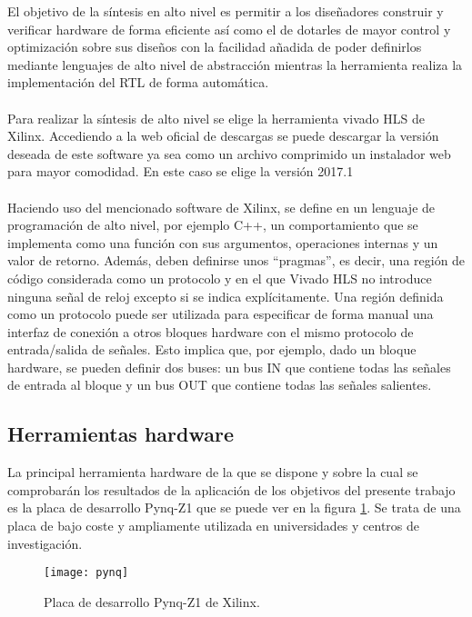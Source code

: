 El objetivo de la síntesis en alto nivel es permitir a los diseñadores construir y verificar hardware de forma eficiente así como el de dotarles de mayor control y optimización sobre sus diseños con la facilidad añadida de poder definirlos mediante lenguajes de alto nivel de abstracción mientras la herramienta realiza la implementación del RTL de forma automática.
\\
\\
Para realizar la síntesis de alto nivel se elige la herramienta vivado HLS de Xilinx. Accediendo a la web oficial de descargas\cite{vivado_descarga} se puede descargar la versión deseada de este software ya sea como un archivo comprimido un instalador web para mayor comodidad. En este caso se elige la versión 2017.1
\\
\\
Haciendo uso del mencionado software de Xilinx, se define en un lenguaje de programación de alto nivel, por ejemplo C++, un comportamiento que se implementa como una función con sus argumentos, operaciones internas y un valor de retorno. Además, deben definirse unos ``pragmas'', es decir, una región de código considerada como un protocolo y en el que Vivado HLS no introduce ninguna señal de reloj excepto si se indica explícitamente. Una región definida como un protocolo puede ser utilizada para especificar de forma manual una interfaz de conexión a otros bloques hardware con el mismo protocolo de entrada/salida de señales. Esto implica que, por ejemplo, dado un bloque hardware, se pueden definir dos buses: un bus IN que contiene todas las señales de entrada al bloque y un bus OUT que contiene todas las señales salientes.



\subsection{Herramientas hardware} \label{herraminetas_hardware}
La principal herramienta hardware de la que se dispone y sobre la cual se comprobarán los resultados de la aplicación de los objetivos del presente trabajo es la placa de desarrollo Pynq-Z1\cite{pynq} que se puede ver en la figura \ref{fig:pynq}. Se trata de una placa de bajo coste y ampliamente utilizada en universidades y centros de investigación.

\begin{figure}[H]
\centering
\texttt{[image: pynq]}
  \caption{Placa de desarrollo Pynq-Z1 de Xilinx.}\label{fig:pynq}
\end{figure}

